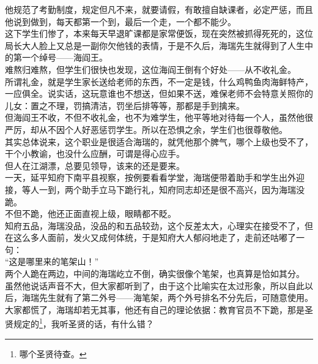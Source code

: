 \begin{multicols}{\theparacolNo}
他规范了考勤制度，规定但凡不来，就要请假，有敢擅自缺课者，必定严惩，而且他说到做到，每天都第一个到，最后一个走，一个都不能少。\\

这下学生们惨了，本来每天早退旷课都是家常便饭，现在突然被抓得死死的，这位局长大人脸上又总是一副你欠他钱的表情，于是不久后，海瑞先生就得到了人生中的第一个绰号——海阎王。\\

难熬归难熬，但学生们很快也发现，这位海阎王倒有个好处——从不收礼金。\\

所谓礼金，就是学生家长送给老师的东西，不一定是钱，什么鸡鸭鱼肉海鲜特产，一应俱全。说实话，这玩意谁也不想送，但如果不送，难保老师不会特意关照你的儿女：置之不理，罚搞清洁，罚坐后排等等，那都是手到擒来。\\

但海阎王不收，不但不收礼金，也不为难学生，他平等地对待每一个人，虽然他很严厉，却从不因个人好恶惩罚学生。所以在恐惧之余，学生们也很尊敬他。\\

其实总体说来，这个职业是很适合海瑞的，就凭他那个脾气，哪个上级也受不了，干个小教谕，也没什么应酬，可谓是得心应手。\\

但人在江湖漂，总要见领导，该来的还是要来。\\

一天，延平知府下南平县视察，按例要看看学堂，海瑞便带着助手和学生出外迎接，等人一到，两个助手立马下跪行礼，知府同志却还是很不高兴，因为海瑞没跪。\\

不但不跪，他还正面直视上级，眼睛都不眨。\\

知府五品，海瑞没品，没品的和五品较劲，这个反差太大，心理实在接受不了，但在这么多人面前，发火又成何体统，于是知府大人郁闷地走了，走前还咕嘟了一句：\\

“这是哪里来的笔架山！”\\

两个人跪在两边，中间的海瑞屹立不倒，确实很像个笔架，也真算是恰如其分。\\

虽然他说话声音不大，但大家都听到了，由于这个比喻实在太过形象，所以自此以后，海瑞先生就有了第二外号——海笔架，两个外号排名不分先后，可随意使用。\\

大家都慌了，海瑞却若无其事，他还有自己的理论依据：教育官员不下跪，那是圣贤规定的\footnote{哪个圣贤待查。}，我听圣贤的话，有什么错？\\


\end{multicols}
